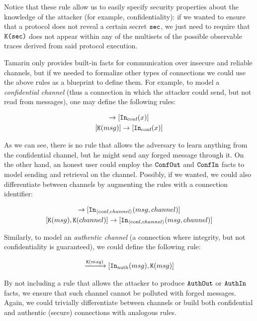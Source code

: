 \documentclass{article}
\newcommand{\mono}[1]{\textrm{\tt #1}}
\begin{document}
Notice that these rule allow us to easily specify security properties about the knowledge of the attacker (for example, confidentiality): if we wanted to ensure that a protocol does not reveal a certain secret $\mono{sec}$, we just need to require that $\mono{K(sec)}$ does not appear within any of the multisets of the possible observable traces derived from said protocol execution.

Tamarin only provides built-in facts for communication over insecure and reliable channels, but if we needed to formalize other types of connections we could use the above rules as a blueprint to define them. For example, to model a \textit{confidential channel} (thus a connection in which the attacker could send, but not read from messages), one may define the following rules:

\begin{gather*}
    [ \mono{Out}_{\textrm{conf}}(msg)] \to [ \mono{In}_{\textrm{conf}}(x) ]\\
    [ \mono{K}(msg) ] \to [ \mono{In}_{\textrm{conf}}(x) ]
\end{gather*}

As we can see, there is no rule that allows the adversary to learn anything from the confidential channel, but he might send any forged message through it. On the other hand, an honest user could employ the $\mono{ConfOut}$ and $\mono{ConfIn}$ facts to model sending and retrieval on the channel. Possibly, if we wanted, we could also differentiate between channels by augmenting the rules with a connection identifier:

\begin{gather*}
    [\mono{Out}_{\langle \textrm{conf}, channel \rangle}(msg, channel)] \to [\mono{In}_{\langle \textrm{conf}, channel \rangle}(msg, channel)]\\
    [\mono{K}(msg), \mono{K}(channel)] \to [\mono{In}_{\langle \textrm{conf}, channel \rangle}(msg, channel)]
\end{gather*}

Similarly, to model an \textit{authentic channel} (a connection where integrity, but not confidentiality is guaranteed), we could define the following rule:

\begin{equation*}
    [\mono{Out}_{\textrm{auth}}(msg)] \xrightarrow{\mono{K}(msg)} [\mono{In}_{\textrm{auth}}(msg), \mono{K}(msg)]
\end{equation*}

By not including a rule that allows the attacker to produce $\mono{AuthOut}$ or $\mono{AuthIn}$ facts, we ensure that such channel cannot be polluted with forged messages. Again, we could trivially differentiate between channels or build both confidential and authentic (secure) connections with analogous rules.
\end{document}
